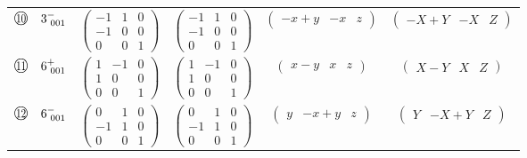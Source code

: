 \documentclass[fleqn,10pt,landscape]{jsarticle}
\begin{document}
\begin{center}
\begin{longtable}{lcccc}
$ {\ooalign{\hfil\resizebox{.8\width}{\height}{10}\hfil\crcr\raise.1ex\hbox{\large$\bigcirc$}}}\quad 3^{-}_{\,\,001} $ & $ \begin{pmatrix} -1 & 1 & 0 \\ -1 & 0 & 0 \\ 0 & 0 & 1 \end{pmatrix} $ & $ \begin{pmatrix} -1 & 1 & 0 \\ -1 & 0 & 0 \\ 0 & 0 & 1 \end{pmatrix} $ & $ \begin{pmatrix} - x + y & - x & z \end{pmatrix} $ & $ \begin{pmatrix} - X + Y & - X & Z \end{pmatrix} $ \\
$ {\ooalign{\hfil\resizebox{.8\width}{\height}{11}\hfil\crcr\raise.1ex\hbox{\large$\bigcirc$}}}\quad 6^{+}_{\,\,001} $ & $ \begin{pmatrix} 1 & -1 & 0 \\ 1 & 0 & 0 \\ 0 & 0 & 1 \end{pmatrix} $ & $ \begin{pmatrix} 1 & -1 & 0 \\ 1 & 0 & 0 \\ 0 & 0 & 1 \end{pmatrix} $ & $ \begin{pmatrix} x - y & x & z \end{pmatrix} $ & $ \begin{pmatrix} X - Y & X & Z \end{pmatrix} $ \\
$ {\ooalign{\hfil\resizebox{.8\width}{\height}{12}\hfil\crcr\raise.1ex\hbox{\large$\bigcirc$}}}\quad 6^{-}_{\,\,001} $ & $ \begin{pmatrix} 0 & 1 & 0 \\ -1 & 1 & 0 \\ 0 & 0 & 1 \end{pmatrix} $ & $ \begin{pmatrix} 0 & 1 & 0 \\ -1 & 1 & 0 \\ 0 & 0 & 1 \end{pmatrix} $ & $ \begin{pmatrix} y & - x + y & z \end{pmatrix} $ & $ \begin{pmatrix} Y & - X + Y & Z \end{pmatrix} $ \\

\end{longtable}
\end{center}
\end{document}
